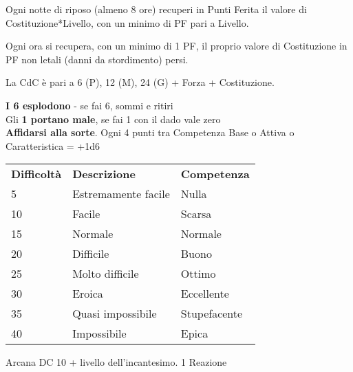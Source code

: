 \documentclass[landscape,10pt,a4paper]{article}
\begin{document}
\begin{multicols}{3}
\begin{dmbox}[title=Riposare 8 ore - pagina \pageref{recuperarepf}]
Ogni notte di riposo (almeno 8 ore) recuperi in Punti Ferita il valore di Costituzione*Livello, con un minimo di PF pari a Livello. 
\end{dmbox}


\begin{dmbox}[title=Danni non letali - pagina \pageref{recuperopuntiferitanonletali}]
Ogni ora si recupera, con un minimo di 1 PF, il proprio valore di Costituzione in PF non letali (danni da stordimento) persi.
\end{dmbox}



\begin{dmbox}[title=Capacità di Carico - pagina \pageref{capacitadicarico}]
La CdC è pari a 6 (P), 12 (M), 24 (G) + Forza + Costituzione.
\end{dmbox}


\begin{dmbox}[title=Golden Rules - pagina \pageref{goldenrules}]
{\textbf{I 6 esplodono}} - se fai 6, sommi e ritiri\\
Gli \textbf{1 portano male}, se fai 1 con il dado vale zero\\
\textbf{Affidarsi alla sorte}. Ogni 4 punti tra Competenza Base o Attiva o Caratteristica = +1d6
\end{dmbox}



\begin{dmbox}[title=Difficoltà e Competenza - pagina \pageref{basedifficolta}]
\begin{tabular}{lll}
\textbf{Difficoltà} & \textbf{Descrizione} & \textbf{Competenza} \\
5 & Estremamente facile  & Nulla\\
10  & Facile & Scarsa\\
15  & Normale  & Normale\\
20  & Difficile  & Buono\\
25  & Molto difficile  & Ottimo\\
30  & Eroica   & Eccellente\\
35  & Quasi impossibile & Stupefacente\\
40  & Impossibile  & Epica\\
\end{tabular}
\end{dmbox}


\begin{dmbox}[title=Riconoscere un incantesimo - pagina \pageref{riconoscereincantesimo}]
	Arcana DC 10 + livello dell'incantesimo. 1 Reazione
\end{dmbox}



\end{multicols}
\end{document}
